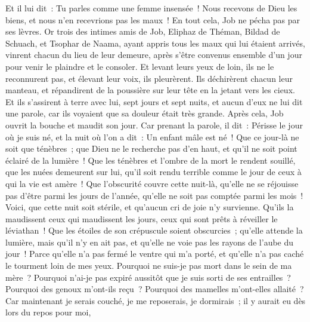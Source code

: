 \begin{multicols}{2}
Et il lui dit~: Tu parles comme une femme insensée~! Nous recevons de Dieu les biens, et nous n'en recevrions pas les maux~! En tout cela, Job ne pécha pas par ses lèvres.
Or trois des intimes amis de Job, Eliphaz de Théman, Bildad de Schuach, et Tsophar de Naama, ayant appris tous les maux qui lui étaient arrivés, vinrent chacun du lieu de leur demeure, après s'être convenus ensemble d'un jour pour venir le plaindre et le consoler.
Et levant leurs yeux de loin, ils ne le reconnurent pas, et élevant leur voix, ils pleurèrent. Ils déchirèrent chacun leur manteau, et répandirent de la poussière sur leur tête en la jetant vers les cieux.
Et ils s'assirent à terre avec lui, sept jours et sept nuits, et aucun d'eux ne lui dit une parole, car ils voyaient que sa douleur était très grande.
\VerseOne{}Après cela, Job ouvrit la bouche et maudit son jour.
Car prenant la parole, il dit~:
Périsse le jour où je suis né, et la nuit où l'on a dit~: Un enfant mâle est né~!
Que ce jour-là ne soit que ténèbres~; que Dieu ne le recherche pas d'en haut, et qu'il ne soit point éclairé de la lumière~! 
Que les ténèbres et l'ombre de la mort le rendent souillé, que les nuées demeurent sur lui, qu'il soit rendu terrible comme le jour de ceux à qui la vie est amère~! 
Que l'obscurité couvre cette nuit-là, qu'elle ne se réjouisse pas d'être parmi les jours de l'année, qu'elle ne soit pas comptée parmi les mois~!
Voici, que cette nuit soit stérile, et qu'aucun cri de joie n'y survienne.
Qu'ils la maudissent ceux qui maudissent les jours, ceux qui sont prêts à réveiller le léviathan~!
Que les étoiles de son crépuscule soient obscurcies~; qu'elle attende la lumière, mais qu'il n'y en ait pas, et qu'elle ne voie pas les rayons de l'aube du jour~!
Parce qu'elle n'a pas fermé le ventre qui m'a porté, et qu'elle n'a pas caché le tourment loin de mes yeux.
Pourquoi ne suis-je pas mort dans le sein de ma mère~? Pourquoi n'ai-je pas expiré aussitôt que je suis sorti de ses entrailles~?
Pourquoi des genoux m'ont-ils reçu~? Pourquoi des mamelles m'ont-elles allaité~?
Car maintenant je serais couché, je me reposerais, je dormirais~; il y aurait eu dès lors du repos pour moi,

\end{multicols}
